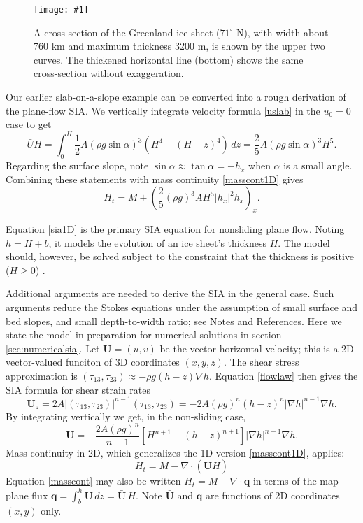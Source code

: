 \documentclass[letterpaper,final,12pt,reqno]{amsart}
\newcommand{\bq}{\mathbf{q}}
\newcommand{\Div}{\nabla\cdot}
\newcommand{\onefigsize}[3]{
\begin{figure}[ht]
\centering
\texttt{[image: \#1]}
\caption{#2}
\label{fig:#1}
\end{figure}}
\begin{document}
\medskip

\onefigsize{green-transect}{A cross-section of the Greenland ice sheet ($71^\circ$ N), with width about 760 km and maximum thickness 3200 m, is shown by the upper two curves.  The thickened horizontal line (bottom) shows the same cross-section without exaggeration.}{4.0in}

Our earlier slab-on-a-slope example can be converted into a rough derivation of the plane-flow SIA.  We vertically integrate velocity formula \eqref{uslab} in the $u_0=0$ case to get
\begin{equation}
\bar U H = \int_0^H \frac{1}{2} A (\rho g \sin\alpha)^3  \left(H^4 - (H-z)^4\right)\,dz = \frac{2}{5} A (\rho g \sin\alpha)^3 H^5. \label{siaubar}
\end{equation}
Regarding the surface slope, note $\sin \alpha \approx \tan\alpha = - h_x$ when $\alpha$ is a small angle.  Combining these statements with mass continuity \eqref{masscont1D} gives
\begin{equation}
  H_t = M + \left(\frac{2}{5} (\rho g)^3 A H^5 |h_x|^2 h_x\right)_x. \label{sia1D}
\end{equation}

Equation \eqref{sia1D} is the primary SIA equation for nonsliding plane flow.  Noting $h=H+b$, it models the evolution of an ice sheet's thickness $H$.  The model should, however, be solved subject to the constraint that the thickness is positive ($H\ge 0$) \cite{Bueler2016,JouvetBueler2012}.

Additional arguments are needed to derive the SIA in the general case.  Such arguments reduce the Stokes equations under the assumption of small surface and bed slopes, and small depth-to-width ratio; see Notes and References.  Here we state the model in preparation for numerical solutions in section \ref{sec:numericalsia}.  Let $\mathbf{U} = (u,v)$ be the vector horizontal velocity; this is a 2D vector-valued funciton of 3D coordinates $(x,y,z)$.  The shear stress approximation is $(\tau_{13},\tau_{23}) \approx - \rho g (h-z) \nabla h$.  Equation \eqref{flowlaw} then gives the SIA formula for shear strain rates
\begin{equation*}
\mathbf{U}_z = 2 A |(\tau_{13},\tau_{23})|^{n-1} (\tau_{13},\tau_{23}) = - 2 A (\rho g)^n (h-z)^n |\nabla h|^{n-1} \nabla h.
\end{equation*}
By integrating vertically we get, in the non-sliding case,
\begin{equation}
\mathbf{U} = - \frac{2 A (\rho g)^n}{n+1} \left[H^{n+1} - (h-z)^{n+1}\right] |\nabla h|^{n-1} \nabla h.  \label{siavelocity}
\end{equation}
Mass continuity in 2D, which generalizes the 1D version \eqref{masscont1D}, applies:
\begin{equation}
    H_t = M - \Div\left(\bar{\mathbf{U}} H\right)  \label{masscont}
\end{equation}
Equation \eqref{masscont} may also be written $H_t = M - \Div \bq$ in terms of the map-plane flux $\bq = \int_{b}^{h} \mathbf{U}\,dz = \bar{\mathbf{U}}\,H$.  Note $\bar{\mathbf{U}}$ and $\bq$ are functions of 2D coordinates $(x,y)$ only.
\end{document}
